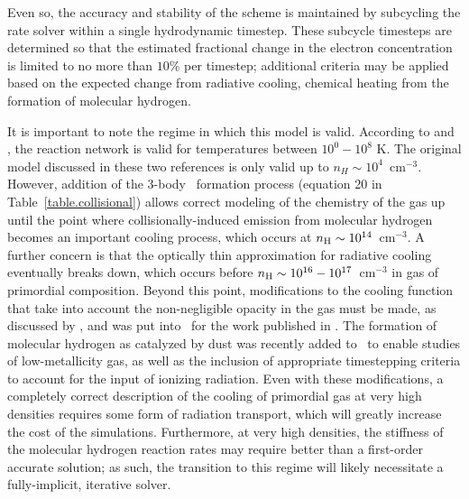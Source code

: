 Even so, the accuracy and stability of the scheme is maintained by subcycling
the rate solver within a single hydrodynamic timestep.  These subcycle
timesteps are determined so that the estimated fractional change in the
electron concentration is limited to no more than $10\%$ per timestep;
additional criteria may be applied based on the expected change from radiative
cooling, chemical heating from the formation of molecular hydrogen.

It is important to note the regime in which this model is valid.
According to \citet{abel97} and \citet{anninos97},
the reaction network is valid for temperatures between $10^0 - 10^8$
K.  The original model discussed in these two references is only valid
up to $n_H \sim 10^4$~cm$^{-3}$.  However, addition of the 3-body
\HH~formation process (equation 20 in Table~\ref{table.collisional})
allows correct modeling of the chemistry of the gas up until the point
where collisionally-induced emission from molecular hydrogen becomes
an important cooling process, which occurs at $n_{\rm H} \sim
10^{14}$~cm$^{-3}$.  A further concern is that the optically thin
approximation for radiative cooling eventually breaks down, which occurs before
$n_{\rm H} \sim 10^{16} - 10^{17}$~cm$^{-3}$ in gas of primordial composition.  Beyond this point,
modifications to the cooling function that take into account the
non-negligible opacity in the gas must be made, as discussed by
\citet{2004MNRAS.348.1019R}, and was put into \enzo\ for the work
published in \citep{2009Sci...325..601T,2009PhDT.........5T}.   The formation
of molecular hydrogen as catalyzed by dust was recently added to \enzo\ to
enable studies of low-metallicity gas, as well as the inclusion of appropriate
timestepping criteria to account for the input of ionizing radiation.  Even
with these modifications, a completely correct description of the cooling of
primordial gas at very high densities requires some form of radiation
transport, which will greatly increase the cost of the simulations.
Furthermore, at very high densities, the stiffness of the molecular hydrogen
reaction rates may require better than a first-order accurate solution; as
such, the transition to this regime will likely necessitate a fully-implicit,
iterative solver.


